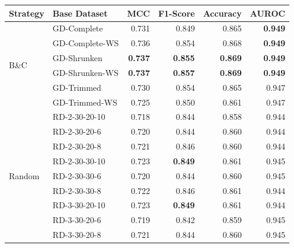 \begin{table}[ht]
	\centering
	\small
	\begin{tabular}{llrrrr}
		\toprule
		Strategy                 & Base Dataset   & MCC            & F1-Score       & Accuracy       & AUROC          \\
		\midrule
		\multirow{6}{*}{B\&C}    & GD-Complete    & 0.731          & 0.849          & 0.865          & \textbf{0.949} \\
		                         & GD-Complete-WS & 0.736          & 0.854          & 0.868          & \textbf{0.949} \\
		                         & GD-Shrunken    & \textbf{0.737} & \textbf{0.855} & \textbf{0.869} & \textbf{0.949} \\
		                         & GD-Shrunken-WS & \textbf{0.737} & \textbf{0.857} & \textbf{0.869} & \textbf{0.949} \\
		                         & GD-Trimmed     & 0.730          & 0.854          & 0.865          & 0.947          \\
		                         & GD-Trimmed-WS  & 0.725          & 0.850          & 0.861          & 0.947          \\
		\midrule
		\multirow{21}{*}{Random} & RD-2-30-20-10  & 0.718          & 0.844          & 0.858          & 0.944          \\
		                         & RD-2-30-20-6   & 0.720          & 0.844          & 0.860          & 0.944          \\
		                         & RD-2-30-20-8   & 0.721          & 0.846          & 0.860          & 0.944          \\
		                         & RD-2-30-30-10  & 0.723          & \textbf{0.849} & 0.861          & 0.945          \\
		                         & RD-2-30-30-6   & 0.720          & 0.844          & 0.860          & 0.945          \\
		                         & RD-2-30-30-8   & 0.722          & 0.846          & 0.861          & 0.944          \\
		                         & RD-3-30-20-10  & 0.723          & \textbf{0.849} & 0.861          & 0.944          \\
		                         & RD-3-30-20-6   & 0.719          & 0.842          & 0.859          & 0.945          \\
		                         & RD-3-30-20-8   & 0.721          & 0.844          & 0.860          & 0.945          \\

\end{tabular}
\end{table}
